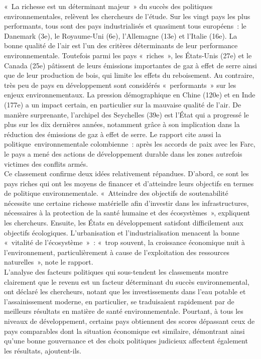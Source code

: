 \documentclass[8pt]{article}
\begin{document}
«\ La richesse est un déterminant majeur\ » du succès des politiques environnementales, relèvent les chercheurs de l'étude. Sur les vingt pays les plus performants, tous sont des pays industrialisés et quasiment tous européens : le Danemark (3e), le Royaume-Uni (6e), l'Allemagne (13e) et l'Italie (16e). La bonne qualité de l'air est l'un des critères déterminants de leur performance environnementale. Toutefois parmi les pays «\ riches\ », les États-Unis (27e) et le Canada (25e) pâtissent de leurs émissions importantes de gaz à effet de serre ainsi que de leur production de bois, qui limite les effets du reboisement.
Au contraire, très peu de pays en développement sont considérés «\ performants\ » sur les enjeux environnementaux. La pression démographique en Chine (120e) et en Inde (177e) a un impact certain, en particulier sur la mauvaise qualité de l'air.
De manière surprenante, l'archipel des Seychelles (39e) est l'État qui a progressé le plus sur les dix dernières années, notamment grâce à son implication dans la réduction des émissions de gaz à effet de serre. Le rapport cite aussi la politique environnementale colombienne : après les accords de paix avec les Farc, le pays a mené des actions de développement durable dans les zones autrefois victimes des conflits armés.\\

Ce classement confirme deux idées relativement répandues.
D'abord, ce sont les pays riches qui ont les moyens de financer et d'atteindre leurs objectifs en termes de politique environnementale. «\ Atteindre des objectifs de soutenabilité nécessite une certaine richesse matérielle afin d'investir dans les infrastructures, nécessaires à la protection de la santé humaine et des écosystèmes\ », expliquent les chercheurs.
Ensuite, les États en développement satisfont difficilement aux objectifs écologiques. L'urbanisation et l'industrialisation menacent la bonne «\ vitalité de l'écosystème\ » : «\ trop souvent, la croissance économique nuit à l'environnement, particulièrement à cause de l'exploitation des ressources naturelles\ », note le rapport.\\

L'analyse des facteurs politiques qui sous-tendent les classements montre clairement que le revenu est un facteur déterminant du succès environnemental, ont déclaré les chercheurs, notant que les investissements dans l'eau potable et l'assainissement moderne, en particulier, se traduisaient rapidement par de meilleurs résultats en matière de santé environnementale. Pourtant, à tous les niveaux de développement, certains pays obtiennent des scores dépassant ceux de pays comparables dont la situation économique est similaire, démontrant ainsi qu'une bonne gouvernance et des choix politiques judicieux affectent également les résultats, ajoutent-ils.\\
\end{document}
